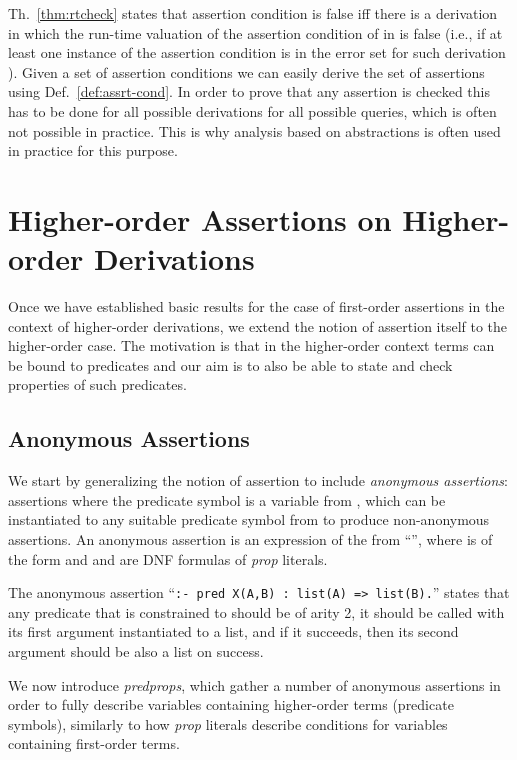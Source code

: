 \documentclass{llncs}
\newcommand{\skbd}[1]{\mbox{\tt\small{#1}}}
\begin{document}
Th.~\ref{thm:rtcheck} states that assertion condition  is false iff
there is a derivation  in which the run-time valuation of the
assertion condition of  in  is false (i.e., if at least one
instance of the assertion condition  is in the error set for such
derivation ).
Given a set of  assertion conditions we can easily derive the set
of  assertions using Def.~\ref{def:assrt-cond}. 
In order to prove that any assertion is checked this has to be
done for all possible derivations for all possible queries, which is
often not possible in practice. This is why analysis based on
abstractions is often used in practice for this purpose.



\section{Higher-order Assertions on Higher-order Derivations}
\label{sec:ho-ho}

Once we have established basic results for the case of first-order
assertions in the context of higher-order derivations, we extend the
notion of assertion itself to the higher-order case.  The motivation
is that in the higher-order context terms can be bound to predicates
and our aim is to also be able to state and check properties of such
predicates.



\subsection{Anonymous Assertions}

We start by generalizing the notion of assertion to include
\emph{anonymous assertions}: assertions where the predicate symbol is
a variable from , which can be instantiated to any suitable
predicate symbol from  to produce non-anonymous assertions. 
An anonymous assertion is an expression of the from 
``'', where 
is of the form  and  and  are
DNF formulas of \emph{prop} literals.

\begin{example}
  The anonymous assertion 
  ``\skbd{:- pred X(A,B) : list(A) => list(B).}''
  states that any predicate  that  is constrained to
  should be of arity 2, it should be called with its first argument
  instantiated to a list, and if it succeeds, then its second argument
  should be also a list on success.
\end{example}

We now introduce \emph{predprops}, which 
gather a number of anonymous assertions in order to fully describe
variables containing higher-order terms (predicate symbols), similarly
to how \emph{prop} literals describe conditions for variables
containing first-order terms. 
\end{document}
